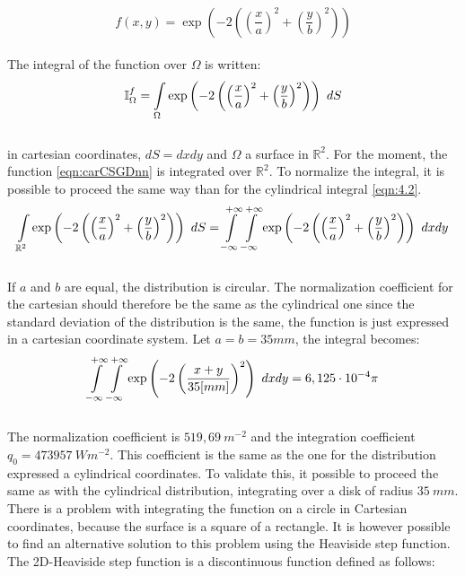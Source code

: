 \\ 
\begin{equation}
    f(x,y) = \exp\left(-2\left(\left(\frac{x}{a}\right)^2 + \left(\frac{y}{b}\right)^2 \right) \right)
    \label{eqn:carCSGDnn}
\end{equation}
\\
\normalsize{The integral of the function over $\Omega$ is written:}
\\ 
\begin{equation}
    \mathbb{I}_{\Omega}^f = \int\displaylimits_{\Omega} \exp\left(-2\left(\left(\frac{x}{a}\right)^2 + \left(\frac{y}{b}\right)^2 \right) \right) \ dS
\end{equation}
\\
\normalsize{in cartesian coordinates, \it{$dS = dxdy$}}
\normalsize{and $\Omega$ a surface in $\mathbb{R}^2$. For the moment, the function \eqref{eqn:carCSGDnn} is integrated over $\mathbb{R}^2$. To normalize the integral, it is possible to proceed the same way than for the cylindrical integral \eqref{eqn:4.2}. }
\\
\begin{equation}
    \int\displaylimits_{\mathbb{R}^2} \exp\left(-2\left(\left(\frac{x}{a}\right)^2 + \left(\frac{y}{b}\right)^2 \right) \right) \ dS = \int\displaylimits_{- \infty}^{+ \infty} \int\displaylimits_{- \infty}^{+ \infty} \exp\left(-2\left(\left(\frac{x}{a}\right)^2 + \left(\frac{y}{b}\right)^2 \right) \right) \ dxdy
\end{equation}
\\
\normalsize{\indent If $a$ and $b$ are equal, the distribution is circular. The normalization coefficient for the cartesian should therefore be the same as the cylindrical one since the standard deviation of the distribution is the same, the function is just expressed in a cartesian coordinate system. Let $a = b = 35mm$, the integral becomes:}
\\
\begin{equation}
    \int\displaylimits_{- \infty}^{+ \infty} \int\displaylimits_{- \infty}^{+ \infty} \exp\left(-2\left(\frac{x+y}{35[mm]}\right)^2\right) \ dxdy = 6,125 \cdot 10^{-4} \pi
\end{equation}
\\
\normalsize{\indent The normalization coefficient is $519,69 \ m^{-2}$ and the integration coefficient $q_0=473957 \ Wm^{-2}$. This coefficient is the same as the one for the distribution expressed a cylindrical coordinates. To validate this, it possible to proceed the same as with the cylindrical distribution, integrating over a disk of radius $35 \ mm$. There is a problem with integrating the function on a circle in Cartesian coordinates, because the surface is a square of a rectangle. It is however possible to find an alternative solution to this problem using the Heaviside step function. The 2D-Heaviside step function is a discontinuous function defined as follows:}
